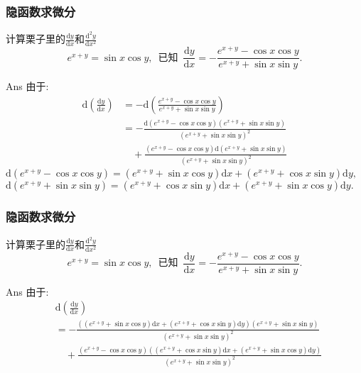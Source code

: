 \documentclass[
10pt,
aspectratio=43,
]{beamer}
\begin{document}
\begin{frame}
	\frametitle{隐函数求微分}
	\everymath{\displaystyle}
	\begin{exampleblock}{{\color{black} 计算栗子里的$\frac{\mathrm{d}y}{\mathrm{d}x}$和$\frac{\mathrm{d}^2y}{\mathrm{d}x^2}$}}
		$$
			e^{x+y}=\sin x\cos y,\,\,\, \text{已知}\,\,\, \frac{\mathrm{d}y}{\mathrm{d}x}=-\frac{e^{x+y}-\cos x\cos y}{e^{x+y}+\sin x\sin y}.
		$$
	\end{exampleblock}
	\begin{block}{Ans}
		由于:
		$$
			\begin{aligned}
				\mathrm{d}\left(\frac{\mathrm{d}y}{\mathrm{d}x}\right) & =-\mathrm{d}\left(\frac{e^{x+y}-\cos x\cos y}{e^{x+y}+\sin x\sin y}\right)                                                     \\
				                                                       & =-\frac{\mathrm{d}\left(e^{x+y}-\cos x\cos y\right)\left(e^{x+y}+\sin x\sin y\right)}{\left(e^{x+y}+\sin x\sin y\right)^2}     \\
				                                                       & \quad+\frac{\left(e^{x+y}-\cos x\cos y\right)\mathrm{d}\left(e^{x+y}+\sin x\sin y\right)}{\left(e^{x+y}+\sin x\sin y\right)^2}
			\end{aligned}
		$$
		$\mathrm{d}\left(e^{x+y}-\cos x\cos y\right)=\left(e^{x+y}+\sin x\cos y\right)\mathrm{d}x+\left(e^{x+y}+\cos x\sin y\right)\mathrm{d}y,$\\
		$\mathrm{d}\left(e^{x+y}+\sin x\sin y\right)=\left(e^{x+y}+\cos x\sin y\right)\mathrm{d}x+\left(e^{x+y}+\sin x\cos y\right)\mathrm{d}y.$
	\end{block}
\end{frame}

\begin{frame}
	\frametitle{隐函数求微分}
	\everymath{\displaystyle}
	\begin{exampleblock}{\color{black}计算栗子里的$\frac{\mathrm{d}y}{\mathrm{d}x}$和$\frac{\mathrm{d}^2y}{\mathrm{d}x^2}$}
		$$
			e^{x+y}=\sin x\cos y,\,\,\, \text{已知}\,\,\, \frac{\mathrm{d}y}{\mathrm{d}x}=-\frac{e^{x+y}-\cos x\cos y}{e^{x+y}+\sin x\sin y}.
		$$
	\end{exampleblock}
	\begin{block}{Ans}
		由于:
		$$
			\begin{aligned}
				 & \mathrm{d}\left(\frac{\mathrm{d}y}{\mathrm{d}x}\right)                                                                                                                                    \\
				 & =-\frac{\left(\left(e^{x+y}+\sin x\cos y\right)\mathrm{d}x+\left(e^{x+y}+\cos x\sin y\right)\mathrm{d}y\right)\left(e^{x+y}+\sin x\sin y\right)}{\left(e^{x+y}+\sin x\sin y\right)^2}     \\
				 & \quad+\frac{\left(e^{x+y}-\cos x\cos y\right)\left(\left(e^{x+y}+\cos x\sin y\right)\mathrm{d}x+\left(e^{x+y}+\sin x\cos y\right)\mathrm{d}y\right)}{\left(e^{x+y}+\sin x\sin y\right)^2}
			\end{aligned}
		$$
	\end{block}
\end{frame}
\end{document}

